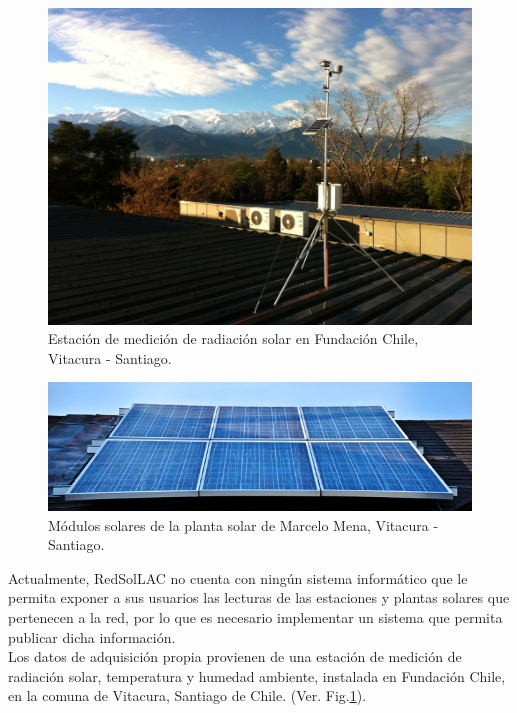 \begin{figure}[h!]
        \centering
        \includegraphics[scale=0.35]{images/estacionDedaloFch}
        \caption{Estación de medición de radiación solar en Fundación Chile, Vitacura - Santiago.}
	\label{fotoEstacionFch2}
\end{figure}

\begin{figure}[h!]
        \centering
        \includegraphics[scale=2.2]{images/mmena}
        \caption{Módulos solares de la planta solar de Marcelo Mena, Vitacura - Santiago.}
        \label{fotoPlantaMarcelo}
\end{figure}

Actualmente, RedSolLAC no cuenta con ningún sistema informático que le permita exponer a sus usuarios las lecturas de las estaciones y plantas solares que pertenecen a la red, por lo que es necesario implementar un sistema que permita publicar dicha información.\\

Los datos de adquisición propia provienen de una estación de medición de radiación solar, temperatura y humedad ambiente, instalada en Fundación Chile, en la comuna de Vitacura, Santiago de Chile. (Ver. Fig.\ref{fotoEstacionFch2}).\\

